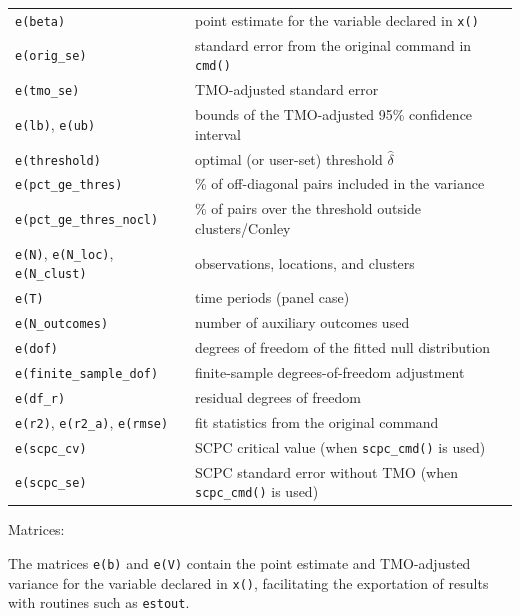 \documentclass[varwidth,bib]{statapress}
\begin{document}
\begin{tabular}{lp{9.5cm}}
  \texttt{e(beta)}              & point estimate for the variable declared in {\tt x()} \\
  \texttt{e(orig\_se)}          & standard error from the original command in {\tt cmd()} \\
  \texttt{e(tmo\_se)}           & TMO-adjusted standard error \\
  \texttt{e(lb)}, \texttt{e(ub)} & bounds of the TMO-adjusted 95\% confidence interval \\
  \texttt{e(threshold)}         & optimal (or user-set) threshold $\hat\delta$ \\
  \texttt{e(pct\_ge\_thres)}    & \% of off-diagonal pairs included in the variance \\
  \texttt{e(pct\_ge\_thres\_nocl)} & \% of pairs over the threshold outside clusters/Conley \\
  \texttt{e(N)}, \texttt{e(N\_loc)}, \texttt{e(N\_clust)} & observations, locations, and clusters \\
  \texttt{e(T)}                 & time periods (panel case) \\
  \texttt{e(N\_outcomes)}       & number of auxiliary outcomes used \\
  \texttt{e(dof)}               & degrees of freedom of the fitted null distribution \\
  \texttt{e(finite\_sample\_dof)} & finite-sample degrees-of-freedom adjustment \\
  \texttt{e(df\_r)}             & residual degrees of freedom \\
  \texttt{e(r2)}, \texttt{e(r2\_a)}, \texttt{e(rmse)} & fit statistics from the original command \\
  \texttt{e(scpc\_cv)}          & SCPC critical value (when {\tt scpc\_cmd()} is used) \\
  \texttt{e(scpc\_se)}          & SCPC standard error without TMO (when {\tt scpc\_cmd()} is used) \\
\end{tabular}

\vspace{3mm}
\noindent Matrices:

\vspace{1mm}
\noindent
The matrices {\tt e(b)} and {\tt e(V)} contain the point estimate and TMO-adjusted variance for the variable declared in {\tt x()}, facilitating the exportation of results with routines such as {\tt estout}.
\end{document}
